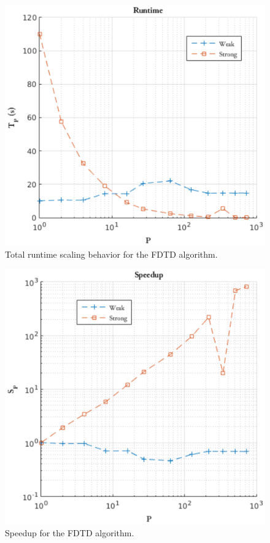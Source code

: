 \documentclass{article}
\begin{document}
\begin{figure}[h]
\centering
\includegraphics[scale=0.6]{figs/runtime.eps}
\caption{Total runtime scaling behavior for the FDTD algorithm.}
\end{figure}

\begin{figure}[!h]
\centering
\includegraphics[scale=0.55]{figs/speedup.eps}
\caption{Speedup for the FDTD algorithm.}
\end{figure}
\end{document}
